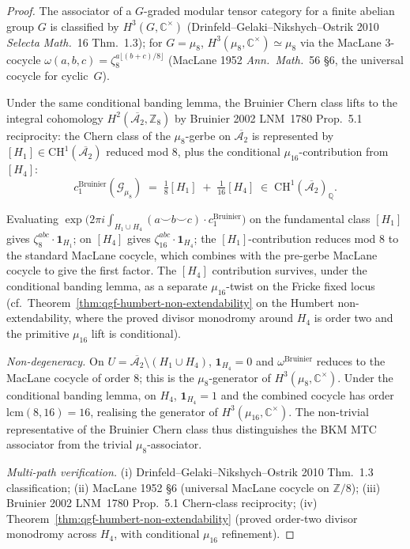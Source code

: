 \begin{proof}
The associator of a $G$-graded modular tensor category for a finite
abelian group $G$ is classified by $H^3(G, \mathbb C^\times)$
(Drinfeld--Gelaki--Nikshych--Ostrik 2010 \emph{Selecta Math.}~16
Thm.~1.3); for $G = \mu_8$, $H^3(\mu_8, \mathbb C^\times) \simeq \mu_8$
via the MacLane $3$-cocycle $\omega(a, b, c) = \zeta_8^{a\lfloor(b+c)/8\rfloor}$
(MacLane 1952 \emph{Ann.\ Math.}~56 \S6, the universal cocycle for
cyclic~$G$).

Under the same conditional banding lemma, the Bruinier Chern class lifts
to the integral cohomology
$H^2(\overline{\mathcal A_2}, \mathbb Z_8)$ by Bruinier 2002 LNM~1780
Prop.~5.1 reciprocity: the Chern class of the $\mu_8$-gerbe on
$\overline{\mathcal A_2}$ is represented by
$[H_1]\in\mathrm{CH}^1(\overline{\mathcal A_2})$ reduced mod $8$, plus
the conditional $\mu_{16}$-contribution from $[H_4]$:
\[
 c_1^{\mathrm{Bruinier}}(\mathcal G_{\mu_8})
 \;=\;
 \tfrac{1}{8}[H_1] \;+\; \tfrac{1}{16}[H_4]
 \;\in\;\mathrm{CH}^1(\overline{\mathcal A_2})_{\mathbb Q}.
\]

Evaluating $\exp\bigl(2\pi i\int_{H_1\cup H_4}(a\smile b\smile c)\cdot
c_1^{\mathrm{Bruinier}}\bigr)$ on the fundamental class $[H_1]$ gives
$\zeta_8^{abc}\cdot\mathbf 1_{H_1}$; on $[H_4]$ gives
$\zeta_{16}^{abc}\cdot\mathbf 1_{H_4}$; the $[H_1]$-contribution reduces
mod $8$ to the standard MacLane cocycle, which combines with the
pre-gerbe MacLane cocycle to give the first factor. The $[H_4]$
contribution survives, under the conditional banding lemma, as a
separate $\mu_{16}$-twist on the Fricke
fixed locus (cf.\ Theorem~\ref{thm:qgf-humbert-non-extendability} on
the Humbert non-extendability, where the proved divisor monodromy around
$H_4$ is order two and the primitive $\mu_{16}$ lift is conditional).

\emph{Non-degeneracy.} On $U = \overline{\mathcal A_2}\setminus
(H_1\cup H_4)$, $\mathbf 1_{H_4} = 0$ and $\omega^{\mathrm{Bruinier}}$
reduces to the MacLane cocycle of order $8$; this is the
$\mu_8$-generator of $H^3(\mu_8, \mathbb C^\times)$. Under the
conditional banding lemma, on $H_4$,
$\mathbf 1_{H_4} = 1$ and the combined cocycle has order
$\mathrm{lcm}(8, 16) = 16$, realising the generator of $H^3(\mu_{16},
\mathbb C^\times)$. The non-trivial representative of the Bruinier
Chern class thus distinguishes the BKM MTC associator from the trivial
$\mu_8$-associator.

\emph{Multi-path verification.}
(i) Drinfeld--Gelaki--Nikshych--Ostrik 2010 Thm.~1.3 classification;
(ii) MacLane 1952 \S6 (universal MacLane cocycle on $\mathbb Z/8$);
(iii) Bruinier 2002 LNM~1780 Prop.~5.1 Chern-class reciprocity;
(iv) Theorem~\ref{thm:qgf-humbert-non-extendability} (proved order-two
 divisor monodromy across $H_4$, with conditional $\mu_{16}$ refinement).
\end{proof}

